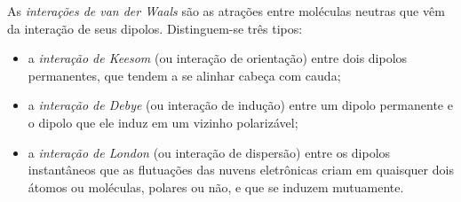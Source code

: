 \begin{definition}\label{def:b1:intermolecular-forces-solvents:vdw}
As \emph{interações de van der Waals}
são as atrações entre moléculas neutras que vêm da interação de seus
dipolos. Distinguem-se três tipos:
\begin{itemize}
  \item a \emph{interação de Keesom} (ou
        interação de orientação) entre dois dipolos permanentes, que
        tendem a se alinhar cabeça com cauda;
  \item a \emph{interação de Debye} (ou
        interação de indução) entre um dipolo permanente e o dipolo que
        ele induz em um vizinho polarizável;
  \item a \emph{interação de London} (ou
        interação de dispersão) entre os dipolos instantâneos que as
        flutuações das nuvens eletrônicas criam em quaisquer dois átomos
        ou moléculas, polares ou não, e que se induzem mutuamente.
\end{itemize}
\end{definition}


